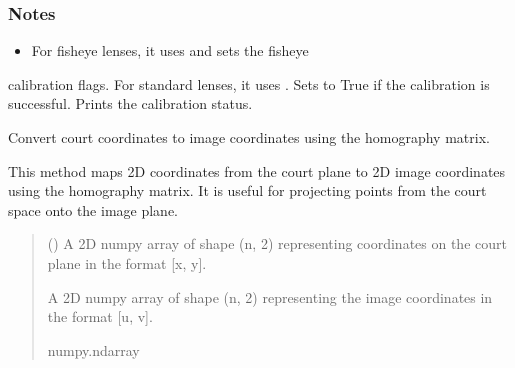 \documentclass[letterpaper,10pt,english]{sphinxmanual}
\begin{document}
\begin{fulllineitems}
\begin{fulllineitems}
\begin{quote}
\begin{description}
\end{description}\end{quote}
\subsubsection*{Notes}
\begin{itemize}
\item {} 
\sphinxAtStartPar
For fisheye lenses, it uses  and sets the fisheye

\end{itemize}

\sphinxAtStartPar
calibration flags.
\sphinxhyphen{} For standard lenses, it uses .
\sphinxhyphen{} Sets  to True if the calibration is successful.
\sphinxhyphen{} Prints the calibration status.

\end{fulllineitems}


\begin{fulllineitems}
\label{\detokenize{CameraUtils:id6}}
\pysigstartsignatures
{}
\pysigstopsignatures
\sphinxAtStartPar
Convert court coordinates to image coordinates using the homography matrix.

\sphinxAtStartPar
This method maps 2D coordinates from the court plane to 2D image coordinates
using the homography matrix. It is useful for projecting points from the court
space onto the image plane.
\begin{quote}\begin{description}
\sphinxAtStartPar
{} () \textendash{} A 2D numpy array of shape (n, 2) representing coordinates on the court plane in the format {[}x, y{]}.

\sphinxAtStartPar
A 2D numpy array of shape (n, 2) representing the image coordinates in the format {[}u, v{]}.

\sphinxAtStartPar
numpy.ndarray

\end{description}\end{quote}

\end{fulllineitems}
\end{fulllineitems}
\end{document}
